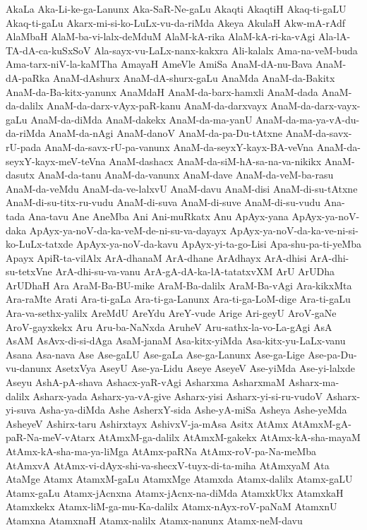 {AkaLa
Aka-Li-ke-ga-Lanunx
Aka-SaR-Ne-gaLu
Akaqti
AkaqtiH
Akaq-ti-gaLU
Akaq-ti-gaLu
Akarx-mi-si-ko-LuLx-vu-da-riMda
Akeya
AkulaH
Akw-mA-rAdf
AlaMbaH
AlaM-ba-vi-lalx-deMduM
AlaM-kA-rika
AlaM-kA-ri-ka-vAgi
Ala-lA-TA-dA-ca-kuSxSoV
Ala-sayx-vu-LaLx-nanx-kakxra
Ali-kalalx
Ama-na-veM-buda
Ama-tarx-niV-la-kaMTha
AmayaH
AmeVle
AmiSa
AnaM-dA-nu-Bava
AnaM-dA-paRka
AnaM-dAshurx
AnaM-dA-shurx-gaLu
AnaMda
AnaM-da-Bakitx
AnaM-da-Ba-kitx-yanunx
AnaMdaH
AnaM-da-barx-hamxli
AnaM-dada
AnaM-da-dalilx
AnaM-da-darx-vAyx-paR-kanu
AnaM-da-darxvayx
AnaM-da-darx-vayx-gaLu
AnaM-da-diMda
AnaM-dakekx
AnaM-da-ma-yanU
AnaM-da-ma-ya-vA-du-da-riMda
AnaM-da-nAgi
AnaM-danoV
AnaM-da-pa-Du-tAtxne
AnaM-da-savx-rU-pada
AnaM-da-savx-rU-pa-vanunx
AnaM-da-seyxY-kayx-BA-veVna
AnaM-da-seyxY-kayx-meV-teVna
AnaM-dashacx
AnaM-da-siM-hA-sa-na-va-nikikx
AnaM-dasutx
AnaM-da-tanu
AnaM-da-vanunx
AnaM-dave
AnaM-da-veM-ba-rasu
AnaM-da-veMdu
AnaM-da-ve-lalxvU
AnaM-davu
AnaM-disi
AnaM-di-su-tAtxne
AnaM-di-su-titx-ru-vudu
AnaM-di-suva
AnaM-di-suve
AnaM-di-su-vudu
Ana-tada
Ana-tavu
Ane
AneMba
Ani
Ani-muRkatx
Anu
ApAyx-yana
ApAyx-ya-noV-daka
ApAyx-ya-noV-da-ka-veM-de-ni-su-va-dayayx
ApAyx-ya-noV-da-ka-ve-ni-si-ko-LuLx-tatxde
ApAyx-ya-noV-da-kavu
ApAyx-yi-ta-go-Lisi
Apa-shu-pa-ti-yeMba
Apayx
ApiR-ta-vilAlx
ArA-dhanaM
ArA-dhane
ArAdhayx
ArA-dhisi
ArA-dhi-su-tetxVne
ArA-dhi-su-va-vanu
ArA-gA-dA-ka-lA-tatatxvXM
ArU
ArUDha
ArUDhaH
Ara
AraM-Ba-BU-mike
AraM-Ba-dalilx
AraM-Ba-vAgi
Ara-kikxMta
Ara-raMte
Arati
Ara-ti-gaLa
Ara-ti-ga-Lanunx
Ara-ti-ga-LoM-dige
Ara-ti-gaLu
Ara-va-sethx-yalilx
AreMdU
AreYdu
AreY-vude
Arige
Ari-geyU
AroV-gaNe
AroV-gayxkekx
Aru
Aru-ba-NaNxda
AruheV
Aru-sathx-la-vo-La-gAgi
AsA
AsAM
AsAvx-di-si-dAga
AsaM-janaM
Asa-kitx-yiMda
Asa-kitx-yu-LaLx-vanu
Asana
Asa-nava
Ase
Ase-gaLU
Ase-gaLa
Ase-ga-Lanunx
Ase-ga-Lige
Ase-pa-Du-vu-danunx
AsetxVya
AseyU
Ase-ya-Lidu
Aseye
AseyeV
Ase-yiMda
Ase-yi-lalxde
Aseyu
AshA-pA-shava
Ashacx-yaR-vAgi
Asharxma
AsharxmaM
Asharx-ma-dalilx
Asharx-yada
Asharx-ya-vA-give
Asharx-yisi
Asharx-yi-si-ru-vudoV
Asharx-yi-suva
Asha-ya-diMda
Ashe
AsherxY-sida
Ashe-yA-miSa
Asheya
Ashe-yeMda
AsheyeV
Ashirx-taru
Ashirxtayx
AshivxV-ja-mAsa
Asitx
AtAmx
AtAmxM-gA-paR-Na-meV-vAtarx
AtAmxM-ga-dalilx
AtAmxM-gakekx
AtAmx-kA-sha-mayaM
AtAmx-kA-sha-ma-ya-liMga
AtAmx-paRNa
AtAmx-roV-pa-Na-meMba
AtAmxvA
AtAmx-vi-dAyx-shi-va-shecxV-tuyx-di-ta-miha
AtAmxyaM
Ata
AtaMge
Atamx
AtamxM-gaLu
AtamxMge
Atamxda
Atamx-dalilx
Atamx-gaLU
Atamx-gaLu
Atamx-jAcnxna
Atamx-jAcnx-na-diMda
AtamxkUkx
AtamxkaH
Atamxkekx
Atamx-liM-ga-mu-Ka-dalilx
Atamx-nAyx-roV-paNaM
AtamxnU
Atamxna
AtamxnaH
Atamx-nalilx
Atamx-nanunx
Atamx-neM-davu
}
